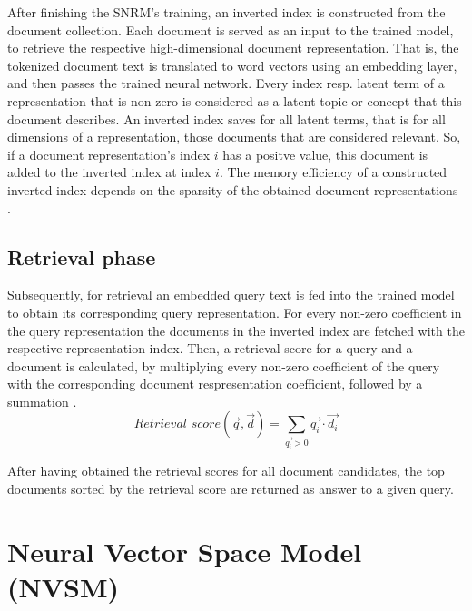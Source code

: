 After finishing the SNRM's training, an inverted index is constructed
    from the document collection.
Each document is served as an input to the trained model, to retrieve
    the respective high-dimensional document representation.
That is, the tokenized document text is translated to word vectors
    using an embedding layer, and then passes the trained 
    neural network.
Every index resp. latent term of a representation that is non-zero
    is considered as a latent topic or concept that this document describes.
An inverted index saves for all latent terms, that is for all dimensions
    of a representation, those documents that are considered relevant.
So, if a document representation's index $i$ has a positve value,
    this document is added to the inverted index at index $i$.
The memory efficiency of a constructed inverted index depends on the
    sparsity of the obtained document representations
    \cite{zamani:2018:from-neural-reranking-to-neural-ranking}.

\subsection*{Retrieval phase}

Subsequently, for retrieval an embedded query text is fed into the trained
    model to obtain its corresponding query representation.
For every non-zero coefficient in the query representation the
    documents in the inverted index are fetched with the respective
    representation index.
Then, a retrieval score for a query and a document is calculated,
    by multiplying every non-zero coefficient of the query with the corresponding
    document respresentation coefficient, followed by a summation
    \cite{zamani:2018:from-neural-reranking-to-neural-ranking}.
\[
Retrieval\_score(\vec{q}, \vec{d}) = \sum_{\vec{q_i} > 0} \vec{q_i} \cdot \vec{d_i}
\]

After having obtained the retrieval scores for all document candidates,
    the top documents sorted by the retrieval score are returned as 
    answer to a given query.

\section{Neural Vector Space Model (NVSM)}

